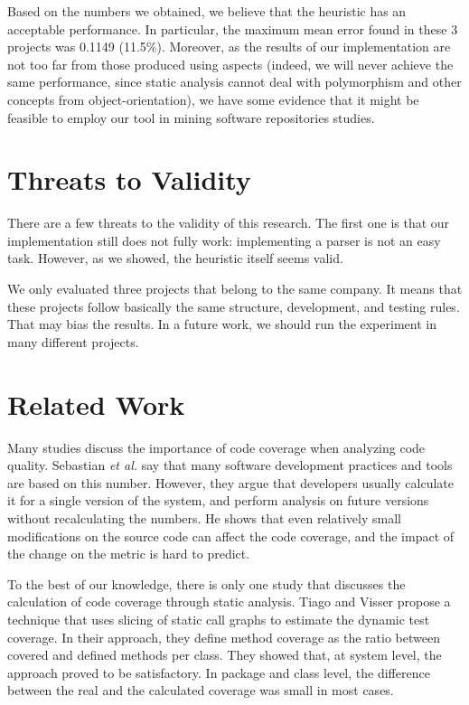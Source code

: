 \documentclass{sig-alternate}
\begin{document}
Based on the numbers we obtained, we believe that the heuristic has an acceptable performance. 
In particular, the maximum mean error found in these 3 projects was 0.1149 (11.5\%). Moreover, 
as the results of our implementation are not too far from those produced using aspects (indeed, we
will never achieve the same performance, since static analysis cannot deal with polymorphism and other
concepts from object-orientation), we have some evidence that it might be feasible to employ our tool
in mining software repositories studies.

\section{Threats to Validity}
\label{sec-threats}

There are a few threats to the validity of this research. The first one is that our implementation
still does not fully work: implementing a parser is not an easy task. However, as we showed, the 
heuristic itself seems valid. 

We only evaluated three projects that belong to the same company. It means that these projects
follow basically the same structure, development, and testing rules. That may bias the results.
In a future work, we should run the experiment in many different projects.

\section{Related Work}
\label{sec-related-work}

Many studies discuss the importance of code coverage when analyzing code quality. 
Sebastian \textit{et al.} \cite{sebastian} say that many software development practices and tools
are based on this number. However, they argue that developers usually calculate it for a single
version of the system, and perform analysis on future versions without recalculating the numbers.
He shows that even relatively small modifications on the source code can affect the code coverage, 
and the impact of the change on the metric is hard to predict.

To the best of our knowledge, there is only one study that discusses the calculation of
code coverage through static analysis. Tiago and Visser \cite{tiago} propose a
technique that uses slicing of static call graphs to estimate the
dynamic test coverage. 
In their approach, they define method coverage as the ratio between covered 
and defined methods per class. They showed that, at system level, the approach
proved to be satisfactory. In package and class level, the difference between
the real and the calculated coverage was small in most cases.
\end{document}
